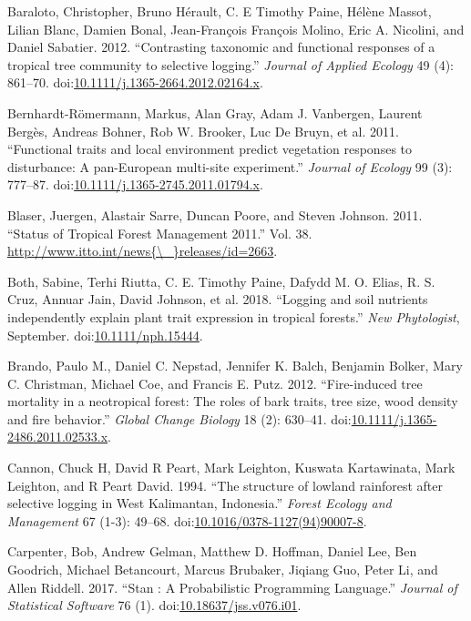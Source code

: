 \documentclass[]{elsarticle} %
\begin{document}
\hypertarget{ref-Baraloto2012}{}
Baraloto, Christopher, Bruno Hérault, C. E Timothy Paine, Hélène Massot,
Lilian Blanc, Damien Bonal, Jean-François François Molino, Eric A.
Nicolini, and Daniel Sabatier. 2012. ``Contrasting taxonomic and
functional responses of a tropical tree community to selective
logging.'' \emph{Journal of Applied Ecology} 49 (4): 861--70.
doi:\href{https://doi.org/10.1111/j.1365-2664.2012.02164.x}{10.1111/j.1365-2664.2012.02164.x}.

\hypertarget{ref-Bernhardt-Romermann2011}{}
Bernhardt-Römermann, Markus, Alan Gray, Adam J. Vanbergen, Laurent
Bergès, Andreas Bohner, Rob W. Brooker, Luc De Bruyn, et al. 2011.
``Functional traits and local environment predict vegetation responses
to disturbance: A pan-European multi-site experiment.'' \emph{Journal of
Ecology} 99 (3): 777--87.
doi:\href{https://doi.org/10.1111/j.1365-2745.2011.01794.x}{10.1111/j.1365-2745.2011.01794.x}.

\hypertarget{ref-Blaser2011}{}
Blaser, Juergen, Alastair Sarre, Duncan Poore, and Steven Johnson. 2011.
``Status of Tropical Forest Management 2011.'' Vol. 38.
\href{http://www.itto.int/news\%7B/_\%7Dreleases/id=2663}{http://www.itto.int/news\{\textbackslash{}\_\}releases/id=2663}.

\hypertarget{ref-Both2018}{}
Both, Sabine, Terhi Riutta, C. E. Timothy Paine, Dafydd M. O. Elias, R.
S. Cruz, Annuar Jain, David Johnson, et al. 2018. ``Logging and soil
nutrients independently explain plant trait expression in tropical
forests.'' \emph{New Phytologist}, September.
doi:\href{https://doi.org/10.1111/nph.15444}{10.1111/nph.15444}.

\hypertarget{ref-Brando2012}{}
Brando, Paulo M., Daniel C. Nepstad, Jennifer K. Balch, Benjamin Bolker,
Mary C. Christman, Michael Coe, and Francis E. Putz. 2012.
``Fire-induced tree mortality in a neotropical forest: The roles of bark
traits, tree size, wood density and fire behavior.'' \emph{Global Change
Biology} 18 (2): 630--41.
doi:\href{https://doi.org/10.1111/j.1365-2486.2011.02533.x}{10.1111/j.1365-2486.2011.02533.x}.

\hypertarget{ref-Cannon1994}{}
Cannon, Chuck H, David R Peart, Mark Leighton, Kuswata Kartawinata, Mark
Leighton, and R Peart David. 1994. ``The structure of lowland rainforest
after selective logging in West Kalimantan, Indonesia.'' \emph{Forest
Ecology and Management} 67 (1-3): 49--68.
doi:\href{https://doi.org/10.1016/0378-1127(94)90007-8}{10.1016/0378-1127(94)90007-8}.

\hypertarget{ref-Carpenter2015}{}
Carpenter, Bob, Andrew Gelman, Matthew D. Hoffman, Daniel Lee, Ben
Goodrich, Michael Betancourt, Marcus Brubaker, Jiqiang Guo, Peter Li,
and Allen Riddell. 2017. ``Stan : A Probabilistic Programming
Language.'' \emph{Journal of Statistical Software} 76 (1).
doi:\href{https://doi.org/10.18637/jss.v076.i01}{10.18637/jss.v076.i01}.
\end{document}
